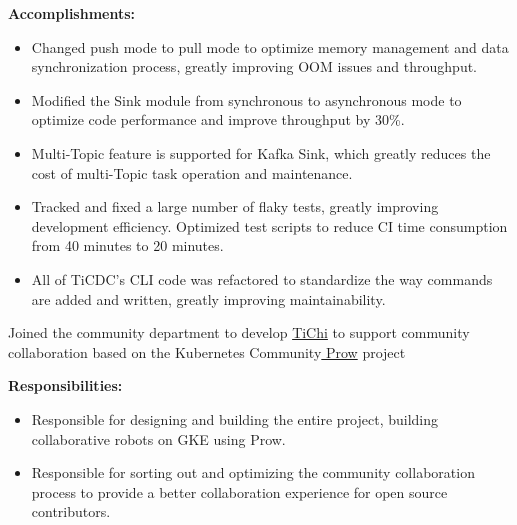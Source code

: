 \documentclass{resume}
\newcommand{\en}[1]{#1}
\newcommand{\zh}[1]{}
\begin{document}
\en{\textbf{Accomplishments:}}
\zh{\textbf{产出：}}
\begin{itemize}
      \item \en{Changed push mode to pull mode to optimize memory management and data synchronization process, greatly improving OOM issues and throughput.}
            \zh{将推送模式修改为了拉取模式优化了内存管理和数据同步流程，极大的改善了 OOM 问题和吞吐。}
      \item \en{Modified the Sink module from synchronous to asynchronous mode to optimize code performance and improve throughput by 30\%.}
            \zh{将 Sink 模块从同步模式修改为异步模式，优化代码性能，将吞吐提升 30\%。}
      \item \en{Multi-Topic feature is supported for Kafka Sink, which greatly reduces the cost of multi-Topic task operation and maintenance.}
            \zh{为 Kafka Sink 支持了多 Topic 功能，极大的降低了多 Topic 的任务运维成本。}
      \item \en{Tracked and fixed a large number of flaky tests, greatly improving development efficiency. Optimized test scripts to reduce CI time consumption from 40 minutes to 20 minutes.}
            \zh{追踪和修复大量不稳定测试，极大的提升了开发效率。优化了测试脚本，将 CI 时间消耗从 40 分钟降低至 20 分钟。}
      \item \en{All of TiCDC's CLI code was refactored to standardize the way commands are added and written, greatly improving maintainability.}
            \zh{重构了 TiCDC 的 CLI 所有代码，标准化了命令添加和编写方式，极大提升了可维护性。}
\end{itemize}
\en{}
\zh{\datedsubsection{\textbf{\href{https://pingcap.com/zh/}{PingCAP Inc. - 数据库 - 前后端开发工程师}}}{2020/08 -- 2021/07}}
\en{Joined the community department to develop {\href{https://github.com/ti-community-infra/tichi}{TiChi}} to support community collaboration based on the Kubernetes Community{\href{https://github.com/kubernetes/test-infra/tree/master/prow}{ Prow}} project}
\zh{加入了社区部门，以 Kubernetes 社区{\href{https://github.com/kubernetes/test-infra/tree/master/prow}{ Prow}} 项目为基础开发{\href{https://github.com/ti-community-infra/tichi}{ TiChi}} 来支撑社区协作}

\en{\textbf{Responsibilities:}}
\zh{\textbf{职责：}}
\begin{itemize}
      \item \en{Responsible for designing and building the entire project, building collaborative robots on GKE using Prow.}
            \zh{负责从零开始设计和构建整个项目，使用 Prow 在 GKE 上搭建协作机器人。}
      \item \en{Responsible for sorting out and optimizing the community collaboration process to provide a better collaboration experience for open source contributors.}
            \zh{负责社区协作流程的梳理和优化，为开源贡献者提供更好的协作体验。}
\end{itemize}
\end{document}
